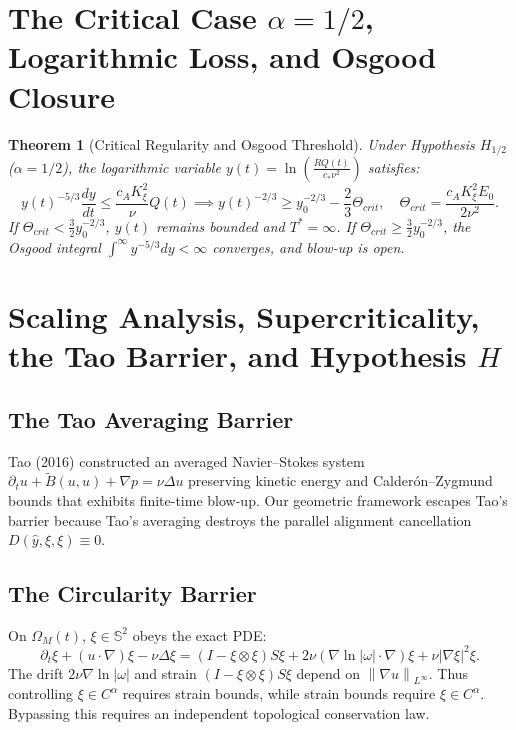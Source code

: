 \documentclass[11pt,reqno]{amsart}
\numberwithin{equation}{section}
\newtheorem{theorem}{Theorem}[section]
\theoremstyle{definition}
\newcommand{\Sspec}{\mathbb{S}}
\newcommand{\norm}[1]{\left\lVert#1\right\rVert}
\begin{document}
\section{The Critical Case $\alpha = 1/2$, Logarithmic Loss, and Osgood Closure}

\begin{theorem}[Critical Regularity and Osgood Threshold]\label{thm:critical}
Under Hypothesis $H_{1/2}$ ($\alpha = 1/2$), the logarithmic variable $y(t) = \ln\left( \frac{R Q(t)}{c_* \nu^2} \right)$ satisfies:
\begin{equation}\label{eq:osgood_ode}
y(t)^{-5/3} \frac{dy}{dt} \le \frac{c_A K_\xi^2}{\nu} Q(t) \implies y(t)^{-2/3} \ge y_0^{-2/3} - \frac{2}{3} \Theta_{crit}, \quad \Theta_{crit} = \frac{c_A K_\xi^2 E_0}{2\nu^2}.
\end{equation}
If $\Theta_{crit} < \frac{3}{2} y_0^{-2/3}$, $y(t)$ remains bounded and $T^* = \infty$.
If $\Theta_{crit} \ge \frac{3}{2} y_0^{-2/3}$, the Osgood integral $\int^\infty y^{-5/3} dy < \infty$ converges, and blow-up is open.
\end{theorem}

\section{Scaling Analysis, Supercriticality, the Tao Barrier, and Hypothesis $H$}\label{sec:tao_barrier}

\subsection*{The Tao Averaging Barrier}
Tao (2016) constructed an averaged Navier--Stokes system $\partial_t u + \widetilde{B}(u, u) + \nabla p = \nu \Delta u$ preserving kinetic energy and Calder\'on--Zygmund bounds that exhibits finite-time blow-up.
Our geometric framework escapes Tao's barrier because Tao's averaging destroys the parallel alignment cancellation $D(\hat{y}, \xi, \xi) \equiv 0$.

\subsection*{The Circularity Barrier}
On $\Omega_M(t)$, $\xi \in \Sspec^2$ obeys the exact PDE:
\begin{equation}\label{eq:directional_pde}
\partial_t \xi + (u \cdot \nabla) \xi - \nu \Delta \xi = (I - \xi \otimes \xi) S \xi + 2\nu (\nabla \ln |\omega| \cdot \nabla) \xi + \nu |\nabla \xi|^2 \xi.
\end{equation}
The drift $2\nu \nabla \ln |\omega|$ and strain $(I - \xi \otimes \xi)S\xi$ depend on $\norm{\nabla u}_{L^\infty}$. Thus controlling $\xi \in C^\alpha$ requires strain bounds, while strain bounds require $\xi \in C^\alpha$. Bypassing this requires an independent topological conservation law.
\end{document}
